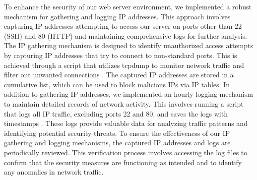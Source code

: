 To enhance the security of our web server environment, we implemented a robust mechanism for gathering and logging IP addresses. This approach involves capturing IP addresses attempting 
to access our server on ports other than 22 (SSH) and 80 (HTTP) and maintaining comprehensive logs for further analysis. The IP gathering mechanism is designed to identify unauthorized access 
attempts by capturing IP addresses that try to connect to non-standard ports. This is achieved through a script that utilizes tcpdump to monitor network traffic and filter out unwanted connections \cite{TechTarget_Net}. 
The captured IP addresses are stored in a cumulative list, which can be used to block malicious IPs via IP tables. In addition to gathering IP addresses, we implemented an hourly logging mechanism to 
maintain detailed records of network activity. This involves running a script that logs all IP traffic, excluding ports 22 and 80, and saves the logs with timestamps \cite{Schwartz_TCPDUMP}. These logs provide valuable data 
for analyzing traffic patterns and identifying potential security threats. To ensure the effectiveness of our IP gathering and logging mechanisms, the captured IP addresses and logs are periodically 
reviewed. This verification process involves accessing the log files to confirm that the security measures are functioning as intended and to identify any anomalies in network traffic.
